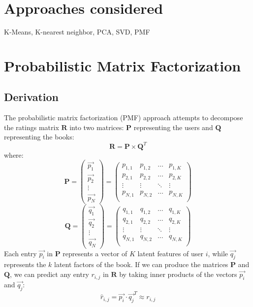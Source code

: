 \documentclass[11pt]{amsart}
\newcommand{\mat}[1]{\mathbf{#1}}
\begin{document}
\section{Approaches considered}
K-Means, K-nearest neighbor, PCA, SVD, PMF

\section{Probabilistic Matrix Factorization}
\subsection{Derivation}
The probabilistic matrix factorization (PMF) approach \cite{Mnih:2007wg} attempts to decompose the ratings matrix $\mat{R}$ into two matrices: $\mat{P}$ representing the users and $\mat{Q}$ representing the books:
$$\mat{R} = \mat{P} \times \mat{Q}^T$$
where:
$$ 
\mat{P} = 
\begin{pmatrix}
	\vec{p_1} \\
	\vec{p_2} \\
	\vdots    \\
	\vec{p_N} 
\end{pmatrix} = 
\begin{pmatrix}
	p_{1,1} & p_{1,2} & \ldots & p_{1,K} \\
	p_{2,1} & p_{2,2} & \ldots & p_{2,K} \\
	\vdots  & \vdots  & \ddots & \vdots  \\
	p_{N,1} & p_{N,2} & \ldots & p_{N,K} \\
\end{pmatrix}
$$
$$ 
\mat{Q} = 
\begin{pmatrix}
	\vec{q_1} \\
	\vec{q_2} \\
	\vdots    \\
	\vec{q_N} 
\end{pmatrix} = 
\begin{pmatrix}
	q_{1,1} & q_{1,2} & \ldots & q_{1,K} \\
	q_{2,1} & q_{2,2} & \ldots & q_{2,K} \\
	\vdots  & \vdots  & \ddots & \vdots  \\
	q_{N,1} & q_{N,2} & \ldots & q_{N,K} \\
\end{pmatrix}
$$
Each entry $\vec{p_i}$ in $\mat{P}$ represents a vector of $K$ latent features of user $i$, while $\vec{q_j}$ represents the $k$ latent factors of the book. If we can produce the matrices $\mat{P}$ and $\mat{Q}$, we can predict any entry $r_{i,j}$ in $\mat{R}$ by taking inner products of the vectors $\vec{p_i}$ and $\vec{q_j}$:
$$\hat{r}_{i,j} = \vec{p_i} \cdot \vec{q_j}^T \approx r_{i,j}$$
\end{document}
